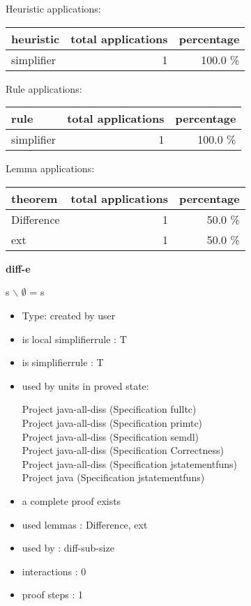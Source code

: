 \documentclass[a4paper]{article}
\begin{document}
\medskip


Heuristic applications:

\begin{supertabular}{l|r|r}
heuristic	& total applications & percentage \\ \hline
simplifier & 1 & 100.0 \% \\

\end{supertabular}

Rule applications:

\begin{supertabular}{l|r|r}
rule	        & total applications & percentage \\ \hline
simplifier & 1 & 100.0 \% \\

\end{supertabular}

Lemma applications:

\begin{supertabular}{l|r|r}
theorem	        & total applications & percentage \\ \hline
Difference & 1 & 50.0 \% \\
ext & 1 & 50.0 \% \\

\end{supertabular}
\pagebreak

{\LARGE\bf diff-e}\label{lemma-diff-e}

\medskip

 \Fol s $\backslash$ $\emptyset$ = s

\begin{itemize}

\item Type: created by user

\item is local simplifierrule : T
\item is simplifierrule : T
\item used by units in proved state:

Project java-all-diss (Specification fulltc) \\
Project java-all-diss (Specification primtc) \\
Project java-all-diss (Specification semdl) \\
Project java-all-diss (Specification Correctness) \\
Project java-all-diss (Specification jstatementfuns) \\
Project java (Specification jstatementfuns)
\item       a complete proof exists
\item       used lemmas  : Difference, ext
\item       used by      : diff-sub-size
\item       interactions : 0
\item       proof steps  : 1
\end{itemize}
\end{document}
